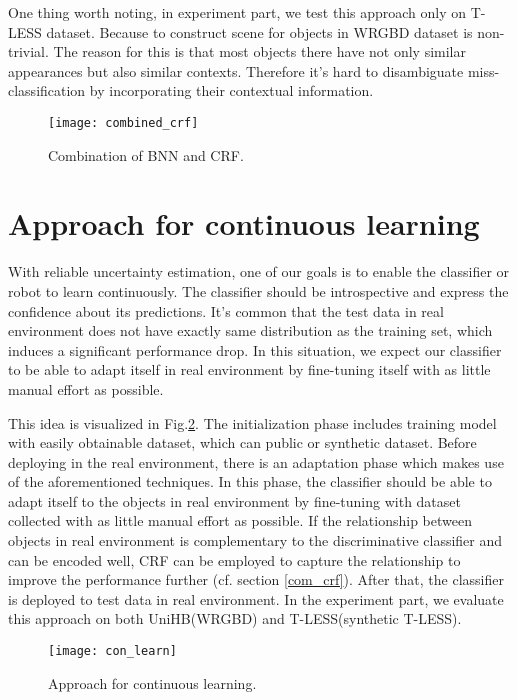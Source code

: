  One thing worth noting, in experiment part, we test this approach only on T-LESS dataset. Because to construct scene for objects in WRGBD dataset is non-trivial. The reason for this is that most objects there have not only similar appearances but also similar contexts. Therefore it's hard to disambiguate miss-classification by incorporating their contextual information.
\begin{figure}[H]
	\begin{center}
		\texttt{[image: combined\_crf]}
		\caption{Combination of BNN and CRF.}		
		\label{fig:combined_crf}
	\end{center}
\end{figure}
\section{Approach for continuous learning}
With reliable uncertainty estimation, one of our goals is to enable the classifier or robot to learn continuously. The classifier should be introspective and express the confidence about its predictions. It's common that the test data in real environment does not have exactly same distribution as the training set, which induces a significant performance drop. In this situation, we expect our classifier to be able to adapt itself in real environment by fine-tuning itself with as little manual effort as possible. 

This idea is visualized in Fig.\ref{fig:con_learn}. The initialization phase includes training model with easily obtainable dataset, which can public or synthetic dataset. Before deploying in the real environment, there is an adaptation phase which makes use of the aforementioned techniques. In this phase, the classifier should be able to adapt itself to the objects in real environment by fine-tuning with dataset collected with as little manual effort as possible. If the relationship between objects in real environment is complementary to the discriminative classifier and can be encoded well, CRF can be employed to capture the relationship to improve the performance further (cf. section \ref{com_crf}). After that, the classifier is deployed to test data in real environment. In the experiment part, we evaluate this approach on both UniHB(WRGBD) and T-LESS(synthetic T-LESS).
\begin{figure}[H]
	\begin{center}
		\texttt{[image: con\_learn]}
		\caption{Approach for continuous learning.}		
		\label{fig:con_learn}
	\end{center}
\end{figure}
